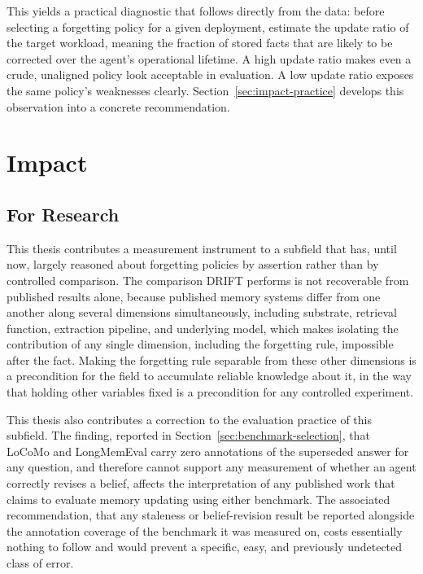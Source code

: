 This yields a practical diagnostic that follows directly from the data: before selecting a forgetting policy for a given deployment, estimate the update ratio of the target workload, meaning the fraction of stored facts that are likely to be corrected over the agent's operational lifetime. A high update ratio makes even a crude, unaligned policy look acceptable in evaluation. A low update ratio exposes the same policy's weaknesses clearly. Section~\ref{sec:impact-practice} develops this observation into a concrete recommendation.

\section{Impact}
\label{sec:impact}

\subsection{For Research}
\label{sec:impact-research}

This thesis contributes a measurement instrument to a subfield that has, until now, largely reasoned about forgetting policies by assertion rather than by controlled comparison. The comparison DRIFT performs is not recoverable from published results alone, because published memory systems differ from one another along several dimensions simultaneously, including substrate, retrieval function, extraction pipeline, and underlying model, which makes isolating the contribution of any single dimension, including the forgetting rule, impossible after the fact. Making the forgetting rule separable from these other dimensions is a precondition for the field to accumulate reliable knowledge about it, in the way that holding other variables fixed is a precondition for any controlled experiment.

This thesis also contributes a correction to the evaluation practice of this subfield. The finding, reported in Section~\ref{sec:benchmark-selection}, that LoCoMo and LongMemEval carry zero annotations of the superseded answer for any question, and therefore cannot support any measurement of whether an agent correctly revises a belief, affects the interpretation of any published work that claims to evaluate memory updating using either benchmark. The associated recommendation, that any staleness or belief-revision result be reported alongside the annotation coverage of the benchmark it was measured on, costs essentially nothing to follow and would prevent a specific, easy, and previously undetected class of error.

